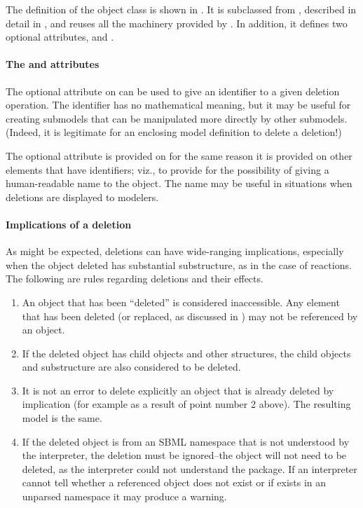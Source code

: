 The definition of the \Deletion object class is shown in
.  It is subclassed from \SBaseRef, described in
detail in , and reuses all the machinery provided
by \SBaseRef.  In addition, it defines two optional attributes,
 and .


\paragraph{The \fixttspace{} and \fixttspace{} attributes}

The optional attribute  on \Deletion can be used to give an
identifier to a given deletion operation.  The identifier has no
mathematical meaning, but it may be useful for creating submodels that
can be manipulated more directly by other submodels.  (Indeed, it is
legitimate for an enclosing model definition to delete a deletion!)

The optional  attribute is provided on \Deletion for the
same reason it is provided on other elements that have identifiers;
viz., to provide for the possibility of giving a human-readable name to
the object.  The name may be useful in situations when deletions are
displayed to modelers.


\paragraph{Implications of a deletion}

As might be expected, deletions can have wide-ranging implications,
especially when the object deleted has substantial substructure, as in
the case of reactions.  The following are rules regarding deletions and
their effects.

\begin{enumerate}

\item An object that has been ``deleted'' is considered inaccessible.
  Any element that has been deleted (or replaced, as discussed in
  ) may not be referenced by an \SBaseRef object.

\item If the deleted object has child objects and other structures, the
  child objects and substructure are also considered to be deleted.

\item It is not an error to delete explicitly an object that is already
  deleted by implication (for example as a result of point number 2
  above).  The resulting model is the same.

\item If the deleted object is from an SBML namespace that is not
  understood by the interpreter, the deletion must be ignored--the 
  object will not need to be deleted, as the interpreter could not
  understand the package.  If an interpreter cannot tell whether 
  a referenced object does not exist or if exists in an unparsed namespace
  it may produce a warning.

\end{enumerate}

